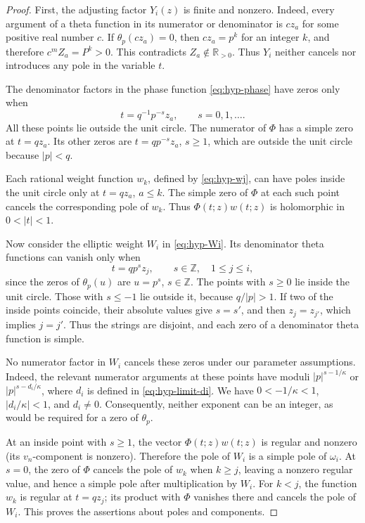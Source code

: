 \documentclass[12pt]{amsart}
\theoremstyle{definition}
\numberwithin{equation}{section}
\theoremstyle{definition}
\let\ka\kappa
\let\tht\theta
\let\om\omega
\let\ge\geqslant
\let\le\leqslant
\def\Z{{\mathbb Z}}
\def\R{{\mathbb R}}
\begin{document}
\begin{proof}
First, the adjusting factor $Y_i(z)$ is finite and nonzero.
Indeed, every argument of a theta function in its numerator
or denominator is $c z_a$ for some positive real number $c$.
If $\tht_p(cz_a)=0$, then $cz_a=p^k$ for an integer $k$,
and therefore $c^mZ_a=P^k>0$. This contradicts
$Z_a\notin\R_{>0}$. Thus $Y_i$ neither cancels nor introduces
any pole in the variable $t$.

The denominator factors in the phase function
\eqref{eq:hyp-phase} have zeros only when
\[
 t=q^{-1}p^{-s}z_a,\qquad s=0,1,\ldots .
\]
All these points lie outside the unit circle. The numerator
of $\Phi$ has a simple zero at $t=qz_a$. Its other zeros
are $t=qp^{-s}z_a$, $s\ge1$, which are outside the unit
circle because $|p|<q$.

Each rational weight function $w_k$, defined by
\eqref{eq:hyp-wj}, can have poles inside the unit circle
only at $t=qz_a$, $a\le k$. The simple zero of $\Phi$
at each such point cancels the corresponding pole of $w_k$.
Thus $\Phi(t;z)w(t;z)$ is holomorphic in $0<|t|<1$.

Now consider the elliptic weight $W_i$ in
\eqref{eq:hyp-Wi}. Its denominator theta functions can
vanish only when
\[
 t=qp^s z_j,\qquad s\in\Z,\quad 1\le j\le i,
\]
since the zeros of $\tht_p(u)$ are $u=p^s$, $s\in\Z$.
The points with $s\ge0$ lie inside the unit circle.
Those with $s\le-1$ lie outside it, because
$q/|p|>1$.  If two of the inside points coincide, their
absolute values give $s=s'$, and then $z_j=z_{j'}$,
which implies $j=j'$. Thus the strings are disjoint, and
each zero of a denominator theta function is simple.

No numerator factor in $W_i$ cancels these zeros under our
parameter assumptions. Indeed, the relevant numerator
arguments at these points have moduli $|p|^{s-1/\ka}$
or $|p|^{s-d_i/\ka}$, where $d_i$ is defined in
\eqref{eq:hyp-limit-di}. We have
$0<-1/\ka<1$, $|d_i/\ka|<1$, and $d_i\ne0$.
Consequently, neither exponent can be an integer, as
would be required for a zero of $\tht_p$.

At an inside point with $s\ge1$, the vector
$\Phi(t;z)w(t;z)$ is regular and nonzero (its
$v_n$-component is nonzero). Therefore the pole of
$W_i$ is a simple pole of $\om_i$. At $s=0$, the zero
of $\Phi$ cancels the pole of $w_k$ when $k\ge j$,
leaving a nonzero regular value, and hence a simple pole
after multiplication by $W_i$. For $k<j$, the function
$w_k$ is regular at $t=qz_j$; its product with $\Phi$
vanishes there and cancels the pole of $W_i$.
This proves the assertions about poles and components.


\end{proof}
\end{document}

